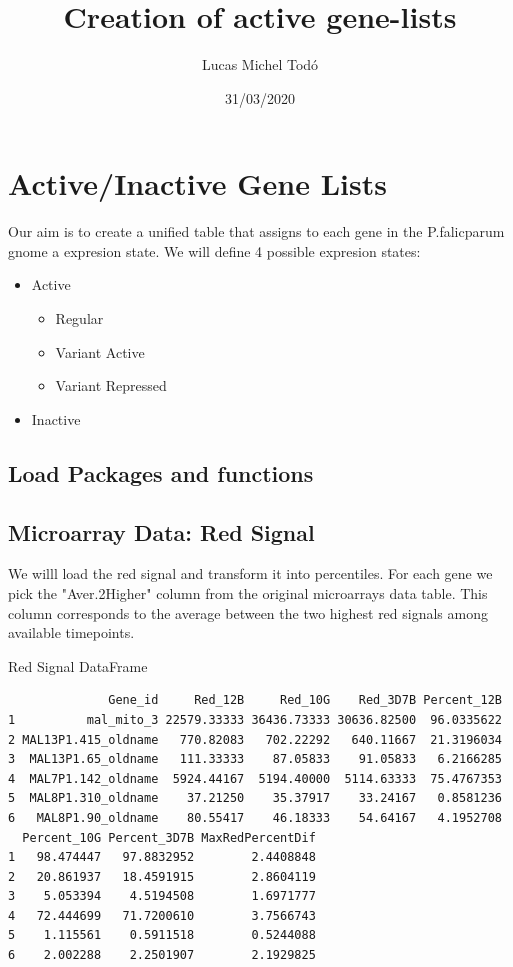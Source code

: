 \documentclass[11pt]{article}
\author{Lucas Michel Todó}
\date{31/03/2020}
\title{Creation of active gene-lists}
\begin{document}
\maketitle
\tableofcontents \clearpage
\section{Active/Inactive Gene Lists}
\label{sec:orgfc7675a}
Our aim is to create a unified table that assigns to each gene in the P.falicparum gnome a expresion state.
We will define 4 possible expresion states:
\begin{itemize}
\item Active
\begin{itemize}
\item Regular
\item Variant Active
\item Variant Repressed
\end{itemize}
\item Inactive
\end{itemize}

\subsection{Load Packages and functions}
\label{sec:org5a96bc7}
\subsection{Microarray Data: Red Signal}
\label{sec:org7e4ceb4}
We willl load the red signal and transform it into percentiles. For each gene we pick the "Aver.2Higher" column from the original microarrays data table. This column corresponds to the average between the two highest red signals among available timepoints.

Red Signal DataFrame
\begin{verbatim}
              Gene_id     Red_12B     Red_10G    Red_3D7B Percent_12B
1          mal_mito_3 22579.33333 36436.73333 30636.82500  96.0335622
2 MAL13P1.415_oldname   770.82083   702.22292   640.11667  21.3196034
3  MAL13P1.65_oldname   111.33333    87.05833    91.05833   6.2166285
4  MAL7P1.142_oldname  5924.44167  5194.40000  5114.63333  75.4767353
5  MAL8P1.310_oldname    37.21250    35.37917    33.24167   0.8581236
6   MAL8P1.90_oldname    80.55417    46.18333    54.64167   4.1952708
  Percent_10G Percent_3D7B MaxRedPercentDif
1   98.474447   97.8832952        2.4408848
2   20.861937   18.4591915        2.8604119
3    5.053394    4.5194508        1.6971777
4   72.444699   71.7200610        3.7566743
5    1.115561    0.5911518        0.5244088
6    2.002288    2.2501907        2.1929825
\end{verbatim}
\end{document}
